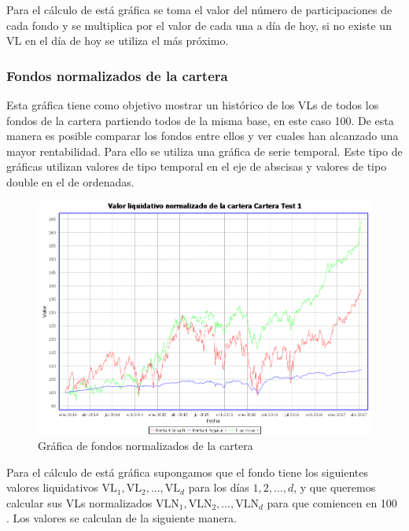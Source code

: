 \documentclass[12pt, a4paper]{book}
\begin{document}
Para el cálculo de está gráfica se toma el valor del número de participaciones de cada fondo y se multiplica por el valor de cada una a día de hoy, si no existe un \gls{VL} en el día de hoy se utiliza el más próximo.\\
\newpage

\subsubsection{Fondos normalizados de la cartera}

Esta gráfica tiene como objetivo mostrar un histórico de los \gls{VL}s de todos los fondos de la cartera partiendo todos de la misma base, en este caso 100. De esta manera es posible comparar los fondos entre ellos y ver cuales han alcanzado una mayor rentabilidad. Para ello se utiliza una gráfica de serie temporal. Este tipo de gráficas utilizan valores de tipo temporal en el eje de abscisas y valores de tipo double en el de ordenadas.\\

	\begin{figure}[htbp]
	\centering
	\includegraphics[width=\textwidth]{figuras/normalizados.PNG}
	\caption{Gráfica de fondos normalizados de la cartera}
	\label{fig:normalizados}
	\end {figure}
	
	


Para el cálculo de está gráfica supongamos que el fondo tiene los siguientes valores liquidativos $\text{VL}_1,\text{VL}_2,\ldots,\text{VL}_d$ para los días $1,2,\ldots,d$, y que queremos calcular sus \gls{VL}s normalizados $\text{VLN}_1,\text{VLN}_2,\ldots,\text{VLN}_d$ para que comiencen en 100 . Los valores se calculan de la siguiente manera.
\end{document}
